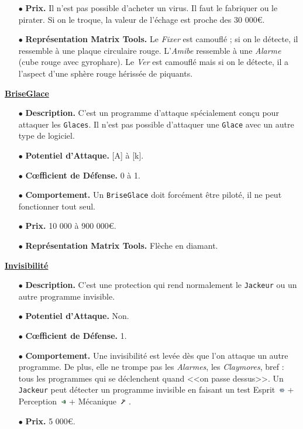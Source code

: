 \documentclass[11pt,twoside,a4paper]{article}
\def\imgESPRI{\includegraphics[width=0.25cm]{../../../../../imgGraphics/rolePlayingGame/SimulacreS/mini12x12/esprit.png} }
\def\imgPERCE{\includegraphics[width=0.25cm]{../../../../../imgGraphics/rolePlayingGame/SimulacreS/mini12x12/perception.png} }
\def\imgMECAN{\includegraphics[width=0.25cm]{../../../../../imgGraphics/rolePlayingGame/SimulacreS/mini12x12/mecanique.png} }
\begin{document}
\begin{multicols*}{2}
\begin{itemize}
	\item[$\bullet$] \textbf{Prix. }Il n'est pas possible d'acheter un virus. Il faut le fabriquer ou le pirater. Si on le troque, la valeur de l'{\'e}chage est proche des 30 000\euro . 
	\item[$\bullet$] \textbf{Repr{\'e}sentation Matrix Tools. }Le \emph{Fixer} est camoufl{\'e} ; si on le d{\'e}tecte, il ressemble {\`a} une plaque circulaire rouge. L'\emph{Amibe} ressemble {\`a} une \emph{Alarme} (cube rouge avec gyrophare). Le \emph{Ver} est camoufl{\'e} mais si on le d{\'e}tecte, il a l'aspect d'une sph{\`e}re rouge h{\'e}riss{\'e}e de piquants. 
\end{itemize} %

\underline{\textbf{BriseGlace}} %
\begin{itemize}
	\item[$\bullet$] \textbf{Description. }C'est un programme d'attaque sp{\'e}cialement con\c{c}u pour attaquer les \texttt{Glaces}. Il n'est pas possible d'attaquer une \texttt{Glace} avec un autre type de logiciel. 
	\item[$\bullet$] \textbf{Potentiel d'Attaque. }[A] {\`a} [k]. 
	\item[$\bullet$] \textbf{C\oe fficient de D{\'e}fense. }0 {\`a} 1. 
	\item[$\bullet$] \textbf{Comportement. }Un \texttt{BriseGlace} doit forc{\'e}ment {\^e}tre pilot{\'e}, il ne peut fonctionner tout seul. 
	\item[$\bullet$] \textbf{Prix. }10 000 {\`a} 900 000\euro. 
	\item[$\bullet$] \textbf{Repr{\'e}sentation Matrix Tools. }Fl{\`e}che en diamant. 
\end{itemize} %

\underline{\textbf{Invisibilit{\'e}}} %
\begin{itemize}
	\item[$\bullet$] \textbf{Description. }C'est une protection qui rend normalement le \texttt{Jackeur} ou un autre programme invisible. 
	\item[$\bullet$] \textbf{Potentiel d'Attaque. }Non. 
	\item[$\bullet$] \textbf{C\oe fficient de D{\'e}fense. }1. 
	\item[$\bullet$] \textbf{Comportement. }Une invisibilit{\'e} est lev{\'e}e d{\`e}s que l'on attaque un autre programme. De plus, elle ne trompe pas les \emph{Alarmes}, les \emph{Claymores}, bref : tous les programmes qui se d{\'e}clenchent quand <<on passe dessus>>. Un \texttt{Jackeur} peut d{\'e}tecter un programme invisible en faisant un test Esprit~\imgESPRI  + Perception~\imgPERCE  + M{\'e}canique~\imgMECAN . 
	\item[$\bullet$] \textbf{Prix. }5 000\euro .
\end{itemize} %


\end{multicols*}
\end{document}
